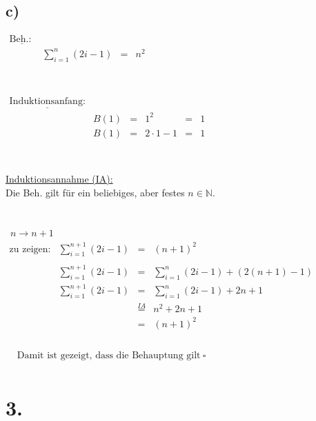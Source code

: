\documentclass[a4paper]{scrartcl}
\newcommand{\qed}{\ \square}
\begin{document}
	\subsection{c)}
		\(		
		\begin{array}{llcl}
			\underline{\text{Beh.: }}& \\
				&\sum\limits_{i=1}^{n}(2i-1)&=&n^2\\
		\end{array}
		\)\\ \\ \\
		\(
		\begin{array}{llclcl}
			\underline{\text{Induktionsanfang:}}& \\
				&B(1)&=&1^2&=&1 \\
				&B(1)&=&2\cdot 1-1&=&1 \\

		\end{array}
		\)\\ \\ \\
		\underline{Induktionsannahme (IA):}\\
		Die Beh. gilt für ein beliebiges, aber festes \(n\in\mathbb{N}\).\\ \\ \\
		\underline{}\ \(n\rightarrow n+1\) \\
		\(
		\begin{array}{llclcl}
			\text{zu zeigen:} & \sum\limits_{i=1}^{n+1}(2i-1)&=&(n+1)^2 \\ \\
			& \sum\limits_{i=1}^{n+1}(2i-1)&=&\sum\limits_{i=1}^{n}(2i-1)+(2(n+1)-1) \\
			& \sum\limits_{i=1}^{n+1}(2i-1)&=&\sum\limits_{i=1}^{n}(2i-1)+2n+1 \\
			& &\overset{IA}{=}&n^2+2n+1 \\
			& &=& (n+1)^2 \\
		\end{array}
		\)\\ \\ 
		\(
		\begin{array}{lcl}
			&\text{Damit ist gezeigt, dass die Behauptung gilt}\qed \\
		\end{array}
		\)


		
\section{3.}
\end{document}
